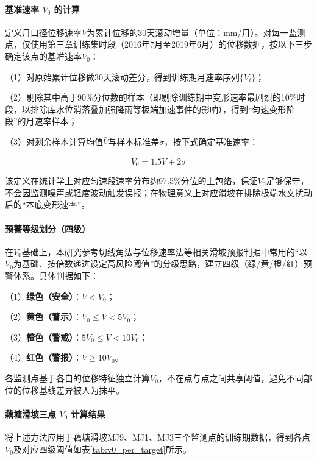 \documentclass[12pt,a4paper]{article}
\begin{document}
\paragraph{\textbf{基准速率 $V_0$ 的计算}}

定义月口径位移速率$V$为累计位移的30天滚动增量（单位：mm/月）。对每一监测点，仅使用第三章训练集时段（2016年7月至2019年6月）的位移数据，按以下三步确定该点的基准速率$V_0$：

    （1）对原始累计位移做30天滚动差分，得到训练期月速率序列$\{V_i\}$；

    （2）剔除其中高于90\%分位数的样本（即剔除训练期中变形速率最剧烈的10\%时段，以排除库水位消落叠加强降雨等极端加速事件的影响），得到“匀速变形阶段”的月速率样本；

    （3）对剩余样本计算均值$\bar V$与样本标准差$\sigma$，按下式确定基准速率：

\begin{equation}
V_0 = 1.5\bar V + 2\sigma
\label{eq:v0-definition}
\end{equation}

该定义在统计学上对应匀速段速率分布约97.5\%分位的上包络，保证$V_0$足够保守，不会因监测噪声或轻度波动触发误报；在物理意义上对应滑坡在排除极端水文扰动后的“本底变形速率”。

\paragraph{\textbf{预警等级划分（四级）}}

在$V_0$基础上，本研究参考切线角法与位移速率法等相关滑坡预报判据中常用的“以$V_0$为基础、按倍数递进设定高风险阈值”的分级思路，建立四级（绿/黄/橙/红）预警体系。具体判据如下：

    （1）\textbf{绿色（安全）}：$V < V_0$；

    （2）\textbf{黄色（警示）}：$V_0 \leq V < 5V_0$；

    （3）\textbf{橙色（警戒）}：$5V_0 \leq V < 10V_0$；

    （4）\textbf{红色（警报）}：$V \geq 10V_0$。

各监测点基于各自的位移特征独立计算$V_0$，不在点与点之间共享阈值，避免不同部位的位移基线差异被人为抹平。

\paragraph{\textbf{藕塘滑坡三点 $V_0$ 计算结果}}

将上述方法应用于藕塘滑坡MJ9、MJ1、MJ3三个监测点的训练期数据，得到各点$V_0$及对应四级阈值如表\ref{tab:v0_per_target}所示。
\end{document}
